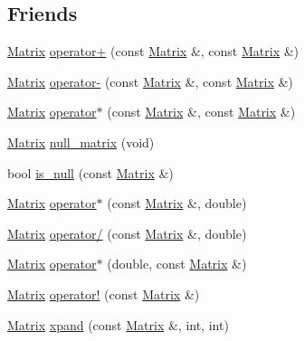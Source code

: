\subsection*{\-Friends}
\begin{DoxyCompactItemize}
\item 
\hyperlink{classchittmatrix_1_1Matrix}{\-Matrix} \hyperlink{classchittmatrix_1_1Matrix_a6d11ed998cc31f97481d26e07afa66d8}{operator+} (const \hyperlink{classchittmatrix_1_1Matrix}{\-Matrix} \&, const \hyperlink{classchittmatrix_1_1Matrix}{\-Matrix} \&)
\item 
\hyperlink{classchittmatrix_1_1Matrix}{\-Matrix} \hyperlink{classchittmatrix_1_1Matrix_a9ed5b2e849ee4b8282934405339fd7a1}{operator-\/} (const \hyperlink{classchittmatrix_1_1Matrix}{\-Matrix} \&, const \hyperlink{classchittmatrix_1_1Matrix}{\-Matrix} \&)
\item 
\hyperlink{classchittmatrix_1_1Matrix}{\-Matrix} \hyperlink{classchittmatrix_1_1Matrix_adf38db67cba468ce4b579a29b568aa5b}{operator$\ast$} (const \hyperlink{classchittmatrix_1_1Matrix}{\-Matrix} \&, const \hyperlink{classchittmatrix_1_1Matrix}{\-Matrix} \&)
\item 
\hyperlink{classchittmatrix_1_1Matrix}{\-Matrix} \hyperlink{classchittmatrix_1_1Matrix_a853635295a3a5ee1479dbaeace7e7d5f}{null\-\_\-matrix} (void)
\item 
bool \hyperlink{classchittmatrix_1_1Matrix_ad43fc2b9436b8dff4587ba7156b79d1c}{is\-\_\-null} (const \hyperlink{classchittmatrix_1_1Matrix}{\-Matrix} \&)
\item 
\hyperlink{classchittmatrix_1_1Matrix}{\-Matrix} \hyperlink{classchittmatrix_1_1Matrix_a40932f59a1546ce6d3826019a05bab6b}{operator$\ast$} (const \hyperlink{classchittmatrix_1_1Matrix}{\-Matrix} \&, double)
\item 
\hyperlink{classchittmatrix_1_1Matrix}{\-Matrix} \hyperlink{classchittmatrix_1_1Matrix_afe8aa28ee4ef3b51c41384487bb9ba02}{operator/} (const \hyperlink{classchittmatrix_1_1Matrix}{\-Matrix} \&, double)
\item 
\hyperlink{classchittmatrix_1_1Matrix}{\-Matrix} \hyperlink{classchittmatrix_1_1Matrix_a492b39cef7e644e988bae3f2688d6c4a}{operator$\ast$} (double, const \hyperlink{classchittmatrix_1_1Matrix}{\-Matrix} \&)
\item 
\hyperlink{classchittmatrix_1_1Matrix}{\-Matrix} \hyperlink{classchittmatrix_1_1Matrix_ab412dd1bebfeb5bf47f23e4da4468efa}{operator!} (const \hyperlink{classchittmatrix_1_1Matrix}{\-Matrix} \&)
\item 
\hyperlink{classchittmatrix_1_1Matrix}{\-Matrix} \hyperlink{classchittmatrix_1_1Matrix_a5e7ddcedc879fd208902ad910186f3c2}{xpand} (const \hyperlink{classchittmatrix_1_1Matrix}{\-Matrix} \&, int, int)

\end{DoxyCompactItemize}
